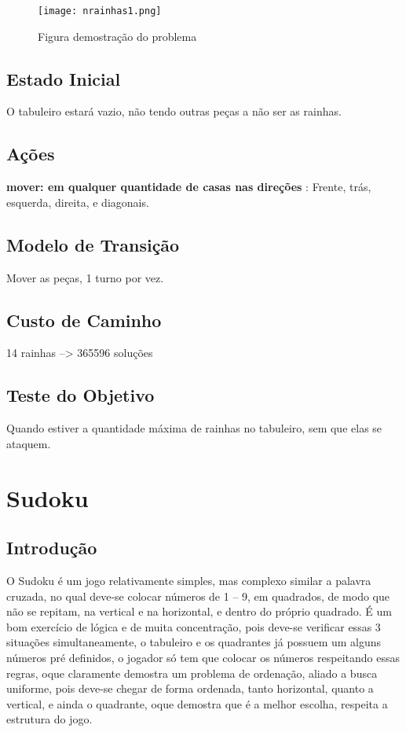 \documentclass[12pt,a4paper,twocolumn]{article}
\begin{document}
\begin{figure}[h]
   \centering
   \texttt{[image: nrainhas1.png]}
   \caption{Figura demostração do problema}
   \label{fig:nrainhas1} 
\end{figure}

\subsection{Estado Inicial}
 O tabuleiro estará vazio, não tendo outras peças a não ser as rainhas.


\subsection{Ações}
 \textbf{ mover: em qualquer quantidade de casas nas direções} : Frente, trás, esquerda, direita, e diagonais.
\subsection{Modelo de Transição}
    Mover as peças, 1 turno por vez.

\subsection{Custo de Caminho}
  14 rainhas --> 365596 soluções
\subsection{Teste do Objetivo}
 Quando estiver a quantidade máxima de rainhas no tabuleiro, sem que elas se ataquem.


\section{Sudoku}

\subsection{Introdução}
	O Sudoku é um jogo relativamente simples, mas complexo similar a palavra cruzada, no qual deve-se colocar números de 1 – 9, em quadrados, de modo que não se repitam, na vertical e na horizontal, e dentro do próprio quadrado. É um bom exercício de lógica e de muita concentração, pois deve-se verificar essas 3 situações simultaneamente, o tabuleiro e os quadrantes já possuem um alguns números pré definidos, o jogador só tem que colocar os números respeitando essas regras, oque claramente demostra um problema de ordenação, aliado a busca uniforme, pois deve-se chegar de forma ordenada, tanto horizontal, quanto a vertical, e ainda o quadrante, oque demostra que é a melhor escolha, respeita a estrutura do jogo.
\end{document}
